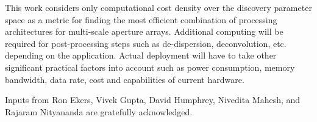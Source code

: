 \documentclass[
  journal=pasa,
  manuscript=article-type,
  year=2020,
  volume=37,
]{cup-journal}
\begin{document}
This work considers only computational cost density over the discovery parameter space as a metric for finding the most efficient combination of processing architectures for multi-scale aperture arrays. Additional computing will be required for post-processing steps such as de-dispersion, deconvolution, etc. depending on the application. Actual deployment will have to take other significant practical factors into account such as power consumption, memory bandwidth, data rate, cost and capabilities of current hardware.

\begin{acknowledgement}
Inputs from Ron Ekers, Vivek Gupta, David Humphrey, Nivedita Mahesh, and Rajaram Nityananda are gratefully acknowledged. 
\end{acknowledgement}







\printendnotes

% 

\end{document}
